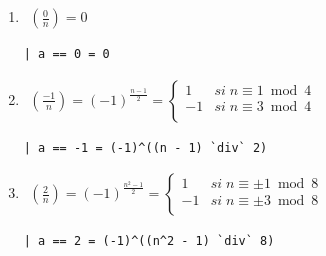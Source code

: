 \documentclass[10pt,spanish]{article}
\begin{document}
\begin{enumerate}[1.]
\begin{verbatim}
| a == 1 = 1
\end{verbatim}

\item
\begin{equation*}
    \begin{aligned}
    \left( \frac{0}{n} \right) = 0
    \end{aligned}
    \phantom{\hspace{18cm}}
\end{equation*}

\begin{verbatim}
| a == 0 = 0
\end{verbatim}

\item
\begin{equation*}
    \begin{aligned}
    \left( \frac{-1}{n} \right) = (-1)^{\frac{n-1}{2}} = \begin{cases}
        1 & si \;n \equiv 1 \bmod 4 \\
        -1 & si \;n \equiv 3 \bmod 4\\
        \end{cases}
    \end{aligned}
    \phantom{\hspace{18cm}}
\end{equation*}

\begin{verbatim}
| a == -1 = (-1)^((n - 1) `div` 2)
\end{verbatim}

\item
\begin{equation*}
    \begin{aligned}
    \left( \frac{2}{n} \right) = (-1)^{\frac{n^2-1}{2}} = \begin{cases}
        1 & si \;n \equiv \pm 1 \bmod 8 \\
        -1 & si \;n \equiv \pm 3 \bmod 8\\
        \end{cases}
    \end{aligned}
    \phantom{\hspace{18cm}}
\end{equation*}

\begin{verbatim}
| a == 2 = (-1)^((n^2 - 1) `div` 8)
\end{verbatim}


\end{enumerate}
\end{document}
